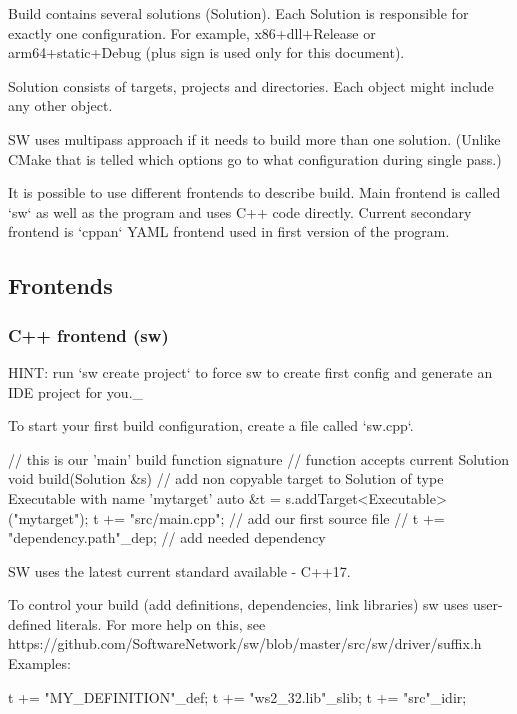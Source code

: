 Build contains several solutions (Solution).
Each Solution is responsible for exactly one configuration. For example, x86+dll+Release or arm64+static+Debug (plus sign is used only for this document).

Solution consists of targets, projects and directories. Each object might include any other object.

SW uses multipass approach if it needs to build more than one solution.
(Unlike CMake that is telled which options go to what configuration during single pass.)

It is possible to use different frontends to describe build.
Main frontend is called `sw` as well as the program and uses C++ code directly.
Current secondary frontend is `cppan` YAML frontend used in first version of the program.

\subsection{Frontends}

\subsubsection{C++ frontend (sw)}

HINT: run `sw create project` to force sw to create first config and generate an IDE project for you._

To start your first build configuration, create a file called `sw.cpp`.

\begin{swcpp}
// this is our 'main' build function signature
// function accepts current Solution
void build(Solution &s)
{
    // add non copyable target to Solution of type Executable with name 'mytarget'
    auto &t = s.addTarget<Executable>("mytarget");
    t += "src/main.cpp"; // add our first source file
    // t += "dependency.path"_dep; // add needed dependency
}
\end{swcpp}

SW uses the latest current standard available - C++17.

To control your build (add definitions, dependencies, link libraries) sw uses user-defined literals. For more help on this, see https://github.com/SoftwareNetwork/sw/blob/master/src/sw/driver/suffix.h
Examples:

\begin{swcpp}
t += "MY_DEFINITION"_def;
t += "ws2_32.lib"_slib;
t += "src"_idir;
\end{swcpp}

